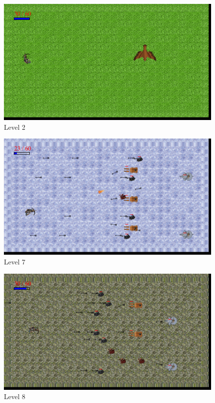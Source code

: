 \newpage
\begin{figure}[h]
	
	\centering
	\includegraphics[width = \textwidth]{sec/pdf/level2}
	\caption{Level 2}
\end{figure}
\vspace{2cm}
\begin{figure}[h]
	
	\centering
	\includegraphics[width = \textwidth]{sec/pdf/level 7}
	\caption{Level 7}
\end{figure}
\newpage
\vspace{2cm}
\begin{figure}[h]
	
	\centering
	\includegraphics[width = \textwidth]{sec/pdf/level 8}
	\caption{Level 8}
\end{figure}

